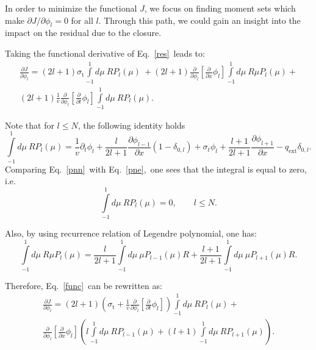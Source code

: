 \documentclass[review]{elsarticle}
\newcommand{\st}{\sigma_\mathrm{t}}
\newcommand{\psii}[1]{\phi_\ensuremath{{#1}}}
\begin{document}
In order to minimize the functional $J$, we focus on finding moment sets which make $\partial J/\partial\psii{l}=0$ for all $l$. Through this path, we could gain an insight into the impact on the residual due to the closure.

Taking the functional derivative of Eq.~\eqref{res}~leads to:
\begin{multline}\label{func}
\frac{\partial J}{\partial\psii{l}}=(2l+1)\st\int\limits_{-1}^{1}d\mu~RP_l(\mu)~+ 
(2l+1)\frac{\partial}{\partial\psii{l}}\left[\frac{\partial}{\partial x}\psii{l}\right]
\int\limits_{-1}^{1}d\mu~R\mu P_l(\mu)+\\(2l+1)\frac{1}{v}\frac{\partial}{\partial\psii{l}}\left[\frac{\partial}{\partial t}\psii{l}\right]\int\limits_{-1}^{1}d\mu~RP_l(\mu).
\end{multline}

Note that for $l\leq N$, the following identity holds%
\begin{equation}\label{pnn}
\int\limits_{-1}^1d\mu~RP_l(\mu)=\frac{1}{v}\partial_t\phi_l+\frac{l}{2l+1}\frac{\partial\phi_{l-1}}{\partial x}(1-\delta_{0,l})+\sigma_{t}\phi_l+\frac{l+1}{2l+1}\frac{\partial\phi_{l+1}}{\partial x}-q_\mathrm{ext}\delta_{0,l}.
\end{equation}
Comparing Eq.~\eqref{pnn}~with Eq.~\eqref{pne},~one sees that the integral is equal to zero, i.e.
\begin{equation}\label{pnn2}
\int\limits_{-1}^1d\mu~RP_l(\mu)=0,\qquad l\leq N.
\end{equation}

Also, by using recurrence relation of Legendre polynomial, one has:
\begin{equation}\label{recurr}
\int\limits_{-1}^{1}d\mu~R\mu P_l(\mu)=\frac{l}{2l+1}\int\limits_{-1}^{1}d\mu~\mu P_{l-1}(\mu)R+\frac{l+1}{2l+1}\int\limits_{-1}^{1}d\mu~\mu P_{l+1}(\mu)R.
\end{equation}

Therefore, Eq.~\eqref{func}~can be rewritten as:
\begin{multline}\label{func2}
\frac{\partial J}{\partial\psii{l}}=(2l+1)\left(\st+\frac{1}{v}\frac{\partial}{\partial\psii{l}}\left[\frac{\partial}{\partial t}\psii{l}\right]\right)\int\limits_{-1}^{1}d\mu~RP_l(\mu)+\\
\frac{\partial}{\partial\psii{l}}\left[\frac{\partial}{\partial x}\psii{l}\right]
\left(l\int\limits_{-1}^{1}d\mu~RP_{l-1}(\mu)+(l+1)\int\limits_{-1}^{1}d\mu~RP_{l+1}(\mu)\right).
\end{multline}
\end{document}
